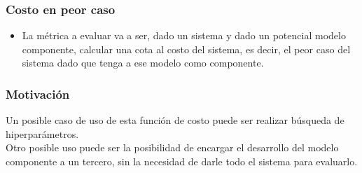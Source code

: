 


\begin{frame}
\frametitle{Costo en peor caso}
\begin{itemize}
\item La m\'etrica a evaluar va a ser, dado un sistema y dado un potencial modelo componente, calcular una cota al costo del sistema, es decir, el peor caso del sistema dado que tenga a ese modelo como componente.
\end{itemize}
\end{frame}



\begin{frame}
\frametitle{Motivaci\'on}
Un posible caso de uso de esta funci\'on de costo puede ser realizar b\'usqueda de hiperpar\'ametros. \\
\vspace{3mm}
Otro posible uso puede ser la posibilidad de encargar el desarrollo del modelo componente a un tercero, sin la necesidad de darle todo el sistema para evaluarlo.
\end{frame}



